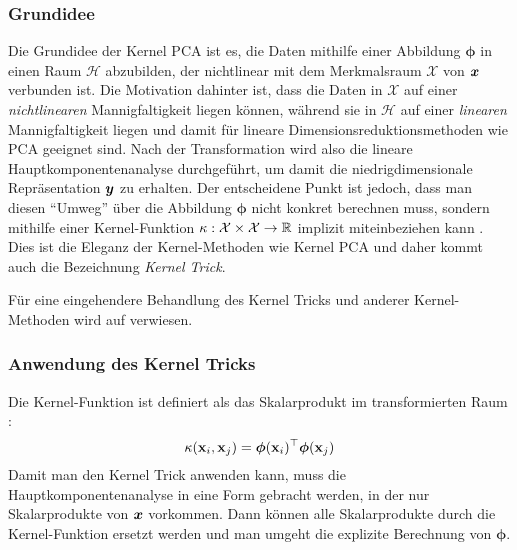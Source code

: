 \subsubsection{Grundidee}
\label{ch:MethodenDerDimRed:traditionell:kPCA:Grundidee}

Die Grundidee der Kernel PCA ist es, die Daten mithilfe einer Abbildung $\bm{\phi}$ in einen Raum $\mathcal{H}$ abzubilden, der nichtlinear mit dem Merkmalsraum $\mathcal{X}$ von $\bm{x}$ verbunden ist. Die Motivation dahinter ist, dass die Daten in $\mathcal{X}$ auf einer \textit{nichtlinearen} Mannigfaltigkeit liegen können, während sie in $\mathcal{H}$ auf einer \textit{linearen} Mannigfaltigkeit liegen und damit für lineare Dimensionsreduktionsmethoden wie PCA geeignet sind. Nach der Transformation wird also
die lineare Hauptkomponentenanalyse durchgeführt, um damit die niedrigdimensionale Repräsentation $\bm{y}$ zu erhalten. Der entscheidene Punkt ist jedoch, dass man diesen \enquote{Umweg} über die Abbildung $\bm{\phi}$ nicht konkret berechnen muss, sondern mithilfe einer Kernel-Funktion $\kappa: \mathcal{X} \times \mathcal{X} \rightarrow \mathbb{R}$ implizit miteinbeziehen kann \parencites[586 -- 588]{Bishop.2006}[583]{Scholkopf.1997}. Dies ist die Eleganz der Kernel-Methoden wie Kernel PCA und daher kommt auch die Bezeichnung \textit{Kernel Trick}.

Für eine eingehendere Behandlung des Kernel Tricks und anderer Kernel-Methoden wird auf \textcite{ShaweTaylor.2011} verwiesen.

\subsubsection{Anwendung des Kernel Tricks}
\label{ch:MethodenDerDimRed:traditionell:kPCA:AnwendungKernelTrick}

Die Kernel-Funktion ist definiert als das Skalarprodukt im transformierten Raum \parencite[60]{ShaweTaylor.2011}:
\begin{equation}
	\kappa(\mathbf{x}_i, \mathbf{x}_j) = \bm{\phi}(\mathbf{x}_i)^\top \bm{\phi}(\mathbf{x}_j)
\end{equation}
Damit man den Kernel Trick anwenden kann, muss die Hauptkomponentenanalyse in eine Form gebracht werden, in der nur Skalarprodukte von $\bm{x}$ vorkommen. Dann können alle Skalarprodukte durch die Kernel-Funktion ersetzt werden \parencite[586]{Bishop.2006} und man umgeht die explizite Berechnung von $\bm{\phi}$.

